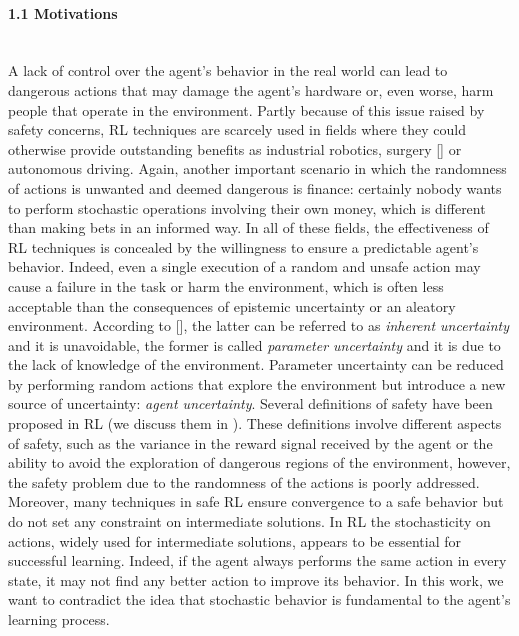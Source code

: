 \paragraph{1.1 Motivations} \mbox{} \\
\newline
A lack of control over the agent's behavior in the real world can lead to dangerous actions that may damage the agent's hardware or, even worse, harm people that operate in the environment. Partly because of this issue raised by safety concerns, \ac{RL} techniques are scarcely used in fields where they could otherwise provide outstanding benefits as industrial robotics, surgery [\cite{baek2018PathPlanning}] or autonomous driving. Again, another important scenario in which the randomness of actions is unwanted and deemed dangerous is finance: certainly nobody wants to perform stochastic operations involving their own money, which is different than making bets in an informed way. In all of these fields, the effectiveness of \ac{RL} techniques is concealed by the willingness to ensure a predictable agent's behavior. Indeed, even a single execution of a random and unsafe action may cause a failure in the task or harm the environment, which is often less acceptable than the consequences of epistemic uncertainty or an aleatory environment. According to [\cite{garcia2015}], the latter can be referred to as \emph{inherent uncertainty} and it is unavoidable, the former is called \emph{parameter uncertainty} and it is due to the lack of knowledge of the environment. Parameter uncertainty can be reduced by performing random actions that explore the environment but introduce a new source of uncertainty: \emph{agent uncertainty}. Several definitions of safety have been proposed in \ac{RL} (we discuss them in ). These definitions involve different aspects of safety, such as the variance in the reward signal received by the agent or the ability to avoid the exploration of dangerous regions of the environment, however, the safety problem due to the randomness of the actions is poorly addressed. Moreover, many techniques in safe \ac{RL} ensure convergence to a safe behavior but do not set any constraint on intermediate solutions. In \ac{RL} the stochasticity on actions, widely used for intermediate solutions, appears to be essential for successful learning. Indeed, if the agent always performs the same action in every state, it may not find any better action to improve its behavior. In this work, we want to contradict the idea that stochastic behavior is fundamental to the agent's learning process.
